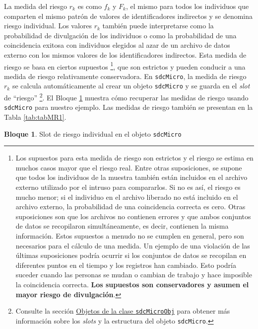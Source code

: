 \documentclass[
]{book}
\theoremstyle{definition}
\theoremstyle{definition}
\newtheorem{example}{Bloque}[chapter]
\theoremstyle{definition}
\theoremstyle{definition}
\theoremstyle{remark}
\begin{document}
La medida del riesgo \(r_{k}\) es como \(f_{k}\) y \(F_{k}\), el mismo para todos los individuos que comparten el mismo patrón de valores de identificadores indirectos y se denomina riesgo individual. Los valores \(r_{k}\) también puede interpretarse como la probabilidad de divulgación de los individuos o como la probabilidad de una coincidencia exitosa con individuos elegidos al azar de un archivo de datos externo con los mismos valores de los identificadores indirectos. Esta medida de riesgo se basa en ciertos supuestos \footnote{Los supuestos para esta medida de riesgo son estrictos y el riesgo se estima en muchos casos mayor que el riesgo real. Entre otras suposiciones, se supone que todos los individuos de la muestra también están incluidos en el archivo externo utilizado por el intruso para compararlos. Si no es así, el riesgo es mucho menor; si el individuo en el archivo liberado no está incluido en el archivo externo, la probabilidad de una coincidencia correcta es cero. Otras suposiciones son que los archivos no contienen errores y que ambos conjuntos de datos se recopilaron simultáneamente, es decir, contienen la misma información. Estos supuestos a menudo no se cumplen en general, pero son necesarios para el cálculo de una medida. Un ejemplo de una violación de las últimas suposiciones podría ocurrir si los conjuntos de datos se recopilan en diferentes puntos en el tiempo y los registros han cambiado. Esto podría suceder cuando las personas se mudan o cambian de trabajo y hace imposible la coincidencia correcta. \textbf{Los supuestos son conservadores y asumen el mayor riesgo de divulgación}.}, que son estrictos y pueden conducir a una medida de riesgo relativamente conservadora. En \texttt{sdcMicro}, la medida de riesgo \(r_{k}\) se calcula automáticamente al crear un objeto \texttt{sdcMicro} y se guarda en el \emph{slot} de ``riesgo'' \footnote{Consulte la sección \protect\hyperlink{objetos-de-la-clase-sdcmicroobj}{Objetos de la clase \texttt{sdcMicroObj}} para obtener más información sobre los \emph{slots} y la estructura del objeto \texttt{sdcMicro}.}. El Bloque \ref{exm:bloqueMR3} muestra cómo recuperar las medidas de riesgo usando \texttt{sdcMicro} para nuestro ejemplo. Las medidas de riesgo también se presentan en la Tabla \ref{tab:tabMR1}.

\begin{example}
\protect\hypertarget{exm:bloqueMR3}{}\label{exm:bloqueMR3}Slot de riesgo individual en el objeto \texttt{sdcMicro}
\end{example}
\end{document}
